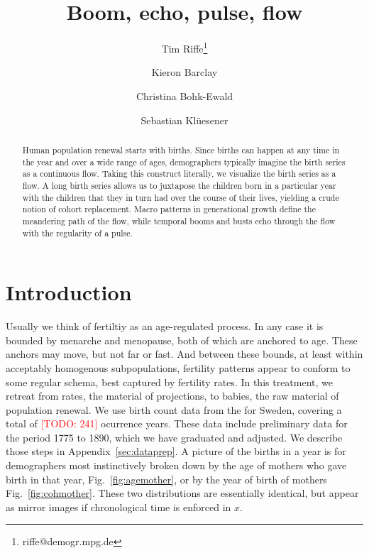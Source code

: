 \documentclass{article}
\renewcommand{\todo}[1]{\textcolor{red}{[TODO: #1]}}
\begin{document}
\title{Boom, echo, pulse, flow}
\author[1]{Tim Riffe\thanks{riffe@demogr.mpg.de}}
\author[1]{Kieron Barclay}
\author[1]{Christina Bohk-Ewald}
\author[2]{Sebastian Kl\"uesener}
\maketitle

\begin{abstract}
Human population renewal starts with births. Since births can happen at any
time in the year and over a wide range of ages, demographers typically imagine
the birth series as a continuous flow. Taking this construct literally, we
visualize the birth series as a flow. A long birth series allows us to
juxtapose the children born in a particular year with the children that
they in turn had over the course of their lives, yielding a crude notion of
cohort replacement. Macro patterns in generational growth define the meandering
path of the flow, while temporal booms and busts echo through the flow with the
regularity of a pulse.
\end{abstract}

\onehalfspacing
\section{Introduction}
Usually we think of fertiltiy as an age-regulated process. In any case it is
bounded by menarche and menopause, both of which are anchored to age. These anchors may
move, but not far or fast. And between these bounds, at least within acceptably homogenous subpopulations, fertility patterns appear to
conform to some regular schema, best captured by fertility rates. In this treatment, we retreat
from rates, the material of projections, to babies, the raw material of
population renewal. We use birth count data from the \citet{HFD} for Sweden, covering a total of \todo{241} ocurrence years. These data include preliminary data for the period 1775 to 1890, which we have graduated and adjusted. We describe those steps in Appendix~\ref{sec:dataprep}. A picture of the births in a year is for demographers most
instinctively broken down by the age of mothers who gave birth in that year,
Fig.~\ref{fig:agemother}, or by the year of birth of mothers Fig.~\ref{fig:cohmother}. These two distributions are essentially identical, but appear as mirror images if chronological time is enforced in $x$.
\end{document}
